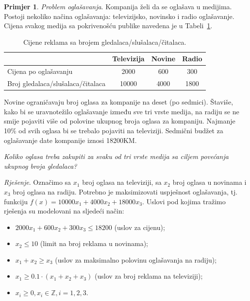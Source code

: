 \documentclass[a4paper, utf8, 11pt, colorlinks]{book}
\theoremstyle{definition}
\newtheorem{primjer}{Primjer}[chapter]
\begin{document}
\begin{primjer}
\emph{Problem oglašavanja}. Kompanija želi da se oglašava u medijima. Postoji nekoliko načina oglašavanja:  televizijsko, novinsko i radio oglašavanje. Cijena svakog medija sa pokrivenošću publike navedena je u Tabeli~\ref{tab:tab_model_advertising}.

\begin{table}[!ht]
	\centering
	\begin{tabular}{l|c|c|c} \hline
		\                  & Televizija & Novine & Radio  \\ \hline
		Cijena po oglašavanju      & 2000       & 600    & 300    \\
		Broj gledalaca/slušalaca/čitalaca      & 10000      & 4000  & 1800 \\ \hline
	\end{tabular}
	\caption{Cijene reklama sa brojem gledalaca/slušalaca/čitalaca.}
	\label{tab:tab_model_advertising}
\end{table}
  

Novine ograničavaju broj oglasa za kompanije na deset (po sedmici). Štaviše, kako bi se uravnotežilo oglašavanje između sve tri vrste medija, na radiju se ne smije pojaviti više od polovine ukupnog broja oglasa za kompaniju. Najmanje 10\% od svih oglasa bi se trebalo pojaviti na televiziji. Sedmični budžet za oglašavanje date kompanije iznosi 18200KM. 

\emph{Koliko oglasa treba zakupiti za svaku od tri vrste medija sa ciljem povećanja ukupnog broja gledalaca?}

\emph{Rješenje}.   Označimo sa $x_1$ broj oglasa na televiziji, sa $x_2$ broj oglasa u novinama i $x_3$ broj oglasa na radiju. Potrebno je maksimizovati   uspješnost oglašavanja, tj. funkciju 
$f(x) = 10000 x_1 + 4000 x_2 + 18000 x_3.$ Uslovi pod kojima tražimo rješenja su modelovani na sljedeći način:
\begin{itemize}
	\item $2000 x_1 + 600 x_2 + 300 x_3 \leq 18200$ (uslov za cijenu);
	\item  $ x_2 \leq 10$ (limit na broj reklama u novinama);
	\item $x_1 + x_2 \geq x_3$ (uslov za maksimalno polovinu oglašavanja na radiju);
	\item ${x_1}\geq 0.1\cdot (x_1 + x_2 + x_3)$ (uslov za broj reklama na televiziji);
	\item $x_i \geq 0, x_i \in \mathbb{Z}, i=1,2,3$.
\end{itemize}

\end{primjer}
\end{document}
